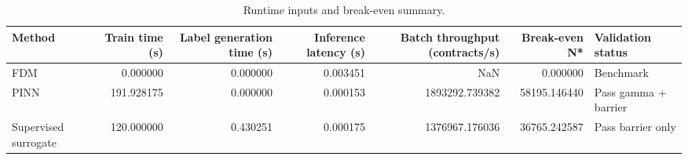 \begin{table}
\caption{Runtime inputs and break-even summary.}
\label{tab:runtime_break_even_summary_ch9}
\begin{tabular}{lrrrrrl}
\toprule
Method & Train time (s) & Label generation time (s) & Inference latency (s) & Batch throughput (contracts/s) & Break-even N* & Validation status \\
\midrule
FDM & 0.000000 & 0.000000 & 0.003451 & NaN & 0.000000 & Benchmark \\
PINN & 191.928175 & 0.000000 & 0.000153 & 1893292.739382 & 58195.146440 & Pass gamma + barrier \\
Supervised surrogate & 120.000000 & 0.430251 & 0.000175 & 1376967.176036 & 36765.242587 & Pass barrier only \\
\bottomrule
\end{tabular}
\end{table}
